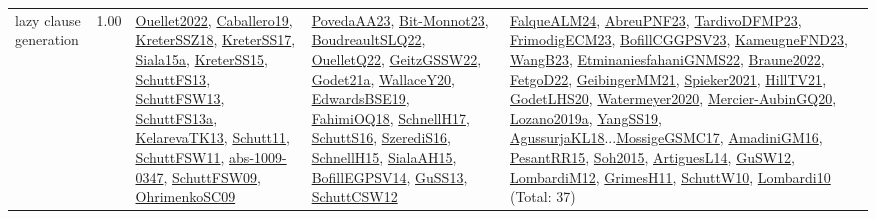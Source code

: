 {\begin{longtable}{p{3cm}r>{\raggedright\arraybackslash}p{6cm}>{\raggedright\arraybackslash}p{6cm}>{\raggedright\arraybackslash}p{8cm}}
\index{lazy clause generation}\index{Algorithms!lazy clause generation}lazy clause generation &  1.00 & \hyperref[detail:Ouellet2022]{Ouellet2022}, \hyperref[detail:Caballero19]{Caballero19}, \hyperref[detail:KreterSSZ18]{KreterSSZ18}, \hyperref[detail:KreterSS17]{KreterSS17}, \hyperref[detail:Siala15a]{Siala15a}, \hyperref[detail:KreterSS15]{KreterSS15}, \hyperref[detail:SchuttFS13]{SchuttFS13}, \hyperref[detail:SchuttFSW13]{SchuttFSW13}, \hyperref[detail:SchuttFS13a]{SchuttFS13a}, \hyperref[detail:KelarevaTK13]{KelarevaTK13}, \hyperref[detail:Schutt11]{Schutt11}, \hyperref[detail:SchuttFSW11]{SchuttFSW11}, \hyperref[detail:abs-1009-0347]{abs-1009-0347}, \hyperref[detail:SchuttFSW09]{SchuttFSW09}, \hyperref[detail:OhrimenkoSC09]{OhrimenkoSC09} & \hyperref[detail:PovedaAA23]{PovedaAA23}, \hyperref[detail:Bit-Monnot23]{Bit-Monnot23}, \hyperref[detail:BoudreaultSLQ22]{BoudreaultSLQ22}, \hyperref[detail:OuelletQ22]{OuelletQ22}, \hyperref[detail:GeitzGSSW22]{GeitzGSSW22}, \hyperref[detail:Godet21a]{Godet21a}, \hyperref[detail:WallaceY20]{WallaceY20}, \hyperref[detail:EdwardsBSE19]{EdwardsBSE19}, \hyperref[detail:FahimiOQ18]{FahimiOQ18}, \hyperref[detail:SchnellH17]{SchnellH17}, \hyperref[detail:SchuttS16]{SchuttS16}, \hyperref[detail:SzerediS16]{SzerediS16}, \hyperref[detail:SchnellH15]{SchnellH15}, \hyperref[detail:SialaAH15]{SialaAH15}, \hyperref[detail:BofillEGPSV14]{BofillEGPSV14}, \hyperref[detail:GuSS13]{GuSS13}, \hyperref[detail:SchuttCSW12]{SchuttCSW12} & \hyperref[detail:FalqueALM24]{FalqueALM24}, \hyperref[detail:AbreuPNF23]{AbreuPNF23}, \hyperref[detail:TardivoDFMP23]{TardivoDFMP23}, \hyperref[detail:FrimodigECM23]{FrimodigECM23}, \hyperref[detail:BofillCGGPSV23]{BofillCGGPSV23}, \hyperref[detail:KameugneFND23]{KameugneFND23}, \hyperref[detail:WangB23]{WangB23}, \hyperref[detail:EtminaniesfahaniGNMS22]{EtminaniesfahaniGNMS22}, \hyperref[detail:Braune2022]{Braune2022}, \hyperref[detail:FetgoD22]{FetgoD22}, \hyperref[detail:GeibingerMM21]{GeibingerMM21}, \hyperref[detail:Spieker2021]{Spieker2021}, \hyperref[detail:HillTV21]{HillTV21}, \hyperref[detail:GodetLHS20]{GodetLHS20}, \hyperref[detail:Watermeyer2020]{Watermeyer2020}, \hyperref[detail:Mercier-AubinGQ20]{Mercier-AubinGQ20}, \hyperref[detail:Lozano2019a]{Lozano2019a}, \hyperref[detail:YangSS19]{YangSS19}, \hyperref[detail:AgussurjaKL18]{AgussurjaKL18}...\hyperref[detail:MossigeGSMC17]{MossigeGSMC17}, \hyperref[detail:AmadiniGM16]{AmadiniGM16}, \hyperref[detail:PesantRR15]{PesantRR15}, \hyperref[detail:Soh2015]{Soh2015}, \hyperref[detail:ArtiguesL14]{ArtiguesL14}, \hyperref[detail:GuSW12]{GuSW12}, \hyperref[detail:LombardiM12]{LombardiM12}, \hyperref[detail:GrimesH11]{GrimesH11}, \hyperref[detail:SchuttW10]{SchuttW10}, \hyperref[detail:Lombardi10]{Lombardi10} (Total: 37)\\

\end{longtable}}
